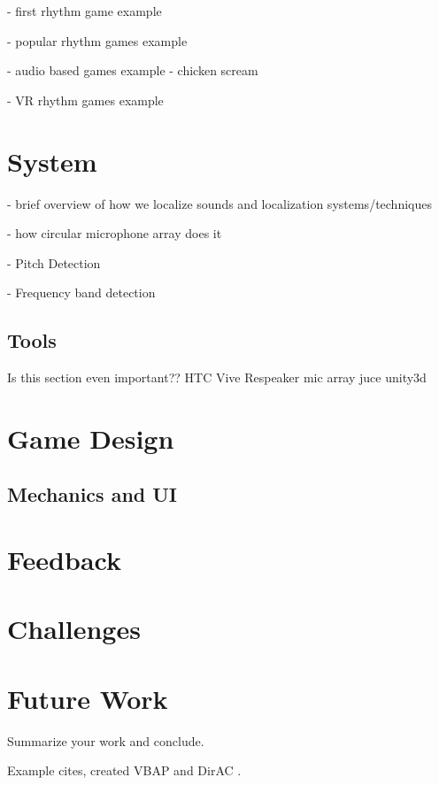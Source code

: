 \documentclass[convention]{aesconf}
\begin{document}
- first rhythm game example

- popular rhythm games example

- audio based games example - chicken scream

- VR rhythm games example

\section{System}  

- brief overview of how we localize sounds and localization systems/techniques

- how circular microphone array does it

- Pitch Detection

- Frequency band detection 

\subsection{Tools} 
Is this section even important??
HTC Vive
Respeaker mic array
juce
unity3d

\section{Game Design} 

\subsection{Mechanics and UI} 

\section{Feedback} 

\section{Challenges} 

\section{Future Work} 

Summarize your work and conclude.

Example cites, \citet{Pulkki1997:VBAPbase} created VBAP and DirAC \citep{Pulkki2007:DirAC_JAES}.




\end{document}
